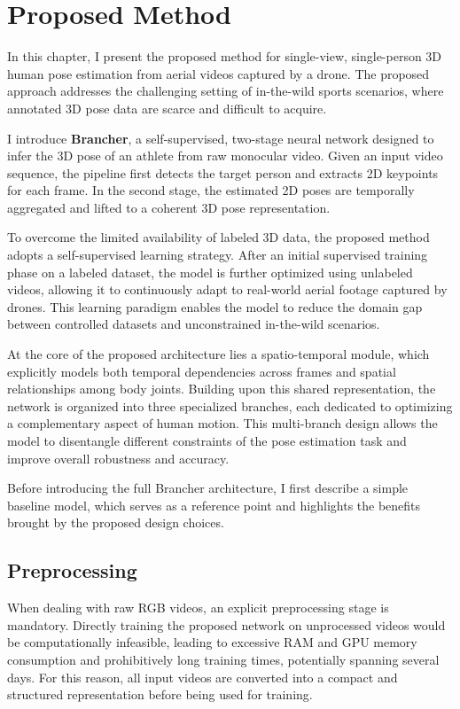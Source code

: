 \chapter{Proposed Method}
In this chapter, I present the proposed method for single-view, single-person 3D human pose estimation from aerial videos captured by a drone. 
The proposed approach addresses the challenging setting of in-the-wild sports scenarios, where annotated 3D pose data are scarce and difficult to acquire.

I introduce \textbf{Brancher}, a self-supervised, two-stage neural network designed to infer the 3D pose of an athlete from raw monocular video.
Given an input video sequence, the pipeline first detects the target person and extracts 2D keypoints for each frame. In the second stage, the estimated 2D poses are 
temporally aggregated and lifted to a coherent 3D pose representation.

To overcome the limited availability of labeled 3D data, the proposed method adopts a self-supervised learning strategy.
After an initial supervised training phase on a labeled dataset, the model is further optimized using unlabeled videos, allowing it to continuously adapt to real-world 
aerial footage captured by drones.
This learning paradigm enables the model to reduce the domain gap between controlled datasets and unconstrained in-the-wild scenarios.

At the core of the proposed architecture lies a spatio-temporal module, which explicitly models both temporal dependencies across frames and spatial 
relationships among body joints.
Building upon this shared representation, the network is organized into three specialized branches, each dedicated to optimizing a complementary aspect of human motion.
This multi-branch design allows the model to disentangle different constraints of the pose estimation task and improve overall robustness and accuracy.

Before introducing the full Brancher architecture, I first describe a simple baseline model, which serves as a reference point and highlights the benefits brought by 
the proposed design choices.


\section{Preprocessing}
\label{sec:preprocess}
When dealing with raw RGB videos, an explicit preprocessing stage is mandatory.
Directly training the proposed network on unprocessed videos would be computationally infeasible, leading to excessive RAM and GPU memory consumption and prohibitively long 
training times, potentially spanning several days.
For this reason, all input videos are converted into a compact and structured representation before being used for training.

